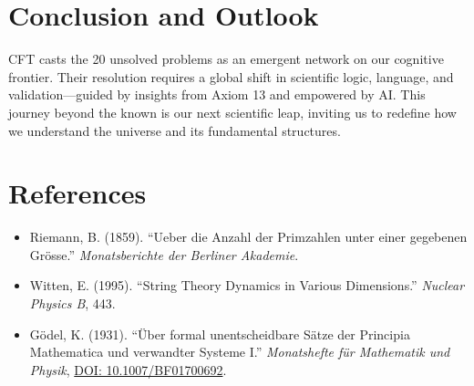 \documentclass[12pt]{article}
\begin{document}
\section*{Conclusion and Outlook}
CFT casts the 20 unsolved problems as an emergent network on our cognitive frontier. Their resolution requires a global shift in scientific logic, language, and validation—guided by insights from Axiom 13 and empowered by AI. This journey beyond the known is our next scientific leap, inviting us to redefine how we understand the universe and its fundamental structures.

\section*{References}
\begin{itemize}
  \item Riemann, B. (1859). “Ueber die Anzahl der Primzahlen unter einer gegebenen Grösse.” \textit{Monatsberichte der Berliner Akademie}.
  \item Witten, E. (1995). “String Theory Dynamics in Various Dimensions.” \textit{Nuclear Physics B}, 443.
  \item Gödel, K. (1931). “Über formal unentscheidbare Sätze der Principia Mathematica und verwandter Systeme I.” \textit{Monatshefte für Mathematik und Physik}, \href{https://doi.org/10.1007/BF01700692}{DOI: 10.1007/BF01700692}.
\end{itemize}
\end{document}
